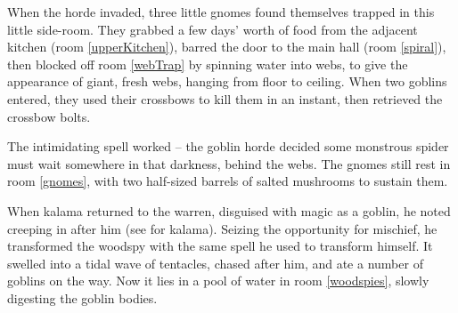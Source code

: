 \glsresetall

\begin{exampletext}
  \noindent
  When the horde invaded, three little gnomes found themselves trapped in this little side-room.
  They grabbed a few days' worth of food from the adjacent kitchen (room \ref{upperKitchen}),
  barred the door to the main hall (room \ref{spiral}), then blocked off room \vref{webTrap} by spinning water into webs, to give the appearance of giant, fresh webs, hanging from floor to ceiling.
  When two goblins entered, they used their crossbows to kill them in an instant, then retrieved the crossbow bolts.

  The intimidating spell worked -- the goblin horde decided some monstrous spider must wait somewhere in that darkness, behind the webs.
  The gnomes still rest in room \ref{gnomes}, with two half-sized barrels of salted mushrooms to sustain them.

  When \gls{kalama}
  returned to the \gls{warren}, disguised with magic as a goblin, he noted  creeping in after him
  (see  for \gls{kalama}).
  Seizing the opportunity for mischief, he transformed the \gls{woodspy} with the same spell he used to transform himself.
  It swelled into a tidal wave of tentacles, chased after him, and ate a number of goblins on the way.
  Now it lies in a pool of water in room \vref{woodspies}, slowly digesting the goblin bodies.
\end{exampletext}

